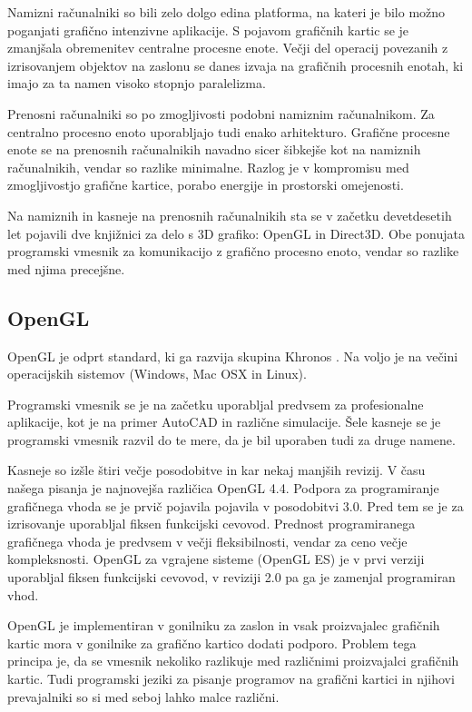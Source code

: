 Namizni računalniki so bili zelo dolgo edina platforma, na kateri je bilo možno poganjati grafično intenzivne aplikacije. S pojavom grafičnih kartic se je zmanjšala obremenitev centralne procesne enote. Večji del operacij povezanih z izrisovanjem objektov na zaslonu se danes izvaja na grafičnih procesnih enotah, ki imajo za ta namen visoko stopnjo paralelizma. 

Prenosni računalniki so po zmogljivosti podobni namiznim računalnikom. Za centralno procesno enoto uporabljajo tudi enako arhitekturo. Grafične procesne enote se na prenosnih računalnikih navadno sicer šibkejše kot na namiznih računalnikih, vendar so razlike minimalne. Razlog je v kompromisu med zmogljivostjo grafične kartice, porabo energije in prostorski omejenosti.

Na namiznih in kasneje na prenosnih računalnikih sta se v začetku devetdesetih let pojavili dve knjižnici za delo s 3D grafiko: OpenGL in Direct3D. Obe ponujata programski vmesnik za komunikacijo z grafično procesno enoto, vendar so razlike med njima precejšne.


\subsection{OpenGL}

OpenGL je odprt standard, ki ga razvija skupina Khronos \cite{opengl}. Na voljo je na večini operacijskih sistemov (Windows, Mac OSX in Linux).

Programski vmesnik se je na začetku uporabljal predvsem za profesionalne aplikacije, kot je na primer AutoCAD in različne simulacije. Šele kasneje se je programski vmesnik razvil do te mere, da je bil uporaben tudi za druge namene.

Kasneje so izšle štiri večje posodobitve in kar nekaj manjših revizij. V času našega pisanja je najnovejša različica OpenGL 4.4. Podpora za programiranje grafičnega vhoda se je prvič pojavila pojavila v posodobitvi 3.0. Pred tem se je za izrisovanje uporabljal fiksen funkcijski cevovod. Prednost programiranega grafičnega vhoda je predvsem v večji fleksibilnosti, vendar za ceno večje kompleksnosti. OpenGL za vgrajene sisteme (OpenGL ES) je v prvi verziji uporabljal fiksen funkcijski cevovod, v reviziji 2.0 pa ga je zamenjal programiran vhod. 

OpenGL je implementiran v gonilniku za zaslon in vsak proizvajalec grafičnih kartic mora v gonilnike za grafično kartico dodati podporo. Problem tega principa je, da se vmesnik nekoliko razlikuje med različnimi proizvajalci grafičnih kartic. Tudi programski jeziki za pisanje programov na grafični kartici in njihovi prevajalniki so si med seboj lahko malce različni.


